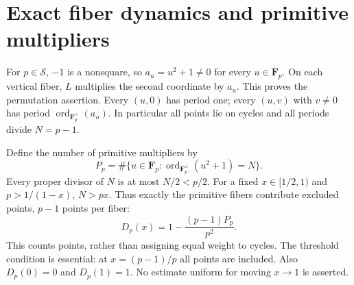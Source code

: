 \documentclass[11pt]{article}
\theoremstyle{remark}
\newcommand{\Fp}{\mathbf F_p}
\newcommand{\ord}{\operatorname{ord}}
\begin{document}
\section{Exact fiber dynamics and primitive multipliers}
For $p\in\mathcal S$, $-1$ is a nonsquare, so $a_u=u^2+1\ne0$ for
every $u\in\Fp$. On each vertical fiber, $L$ multiplies the second
coordinate by $a_u$. This proves the permutation assertion. Every
$(u,0)$ has period one; every $(u,v)$ with $v\ne0$ has period
$\ord_{\Fp^\times}(a_u)$. In particular all points lie on cycles and all
periods divide $N=p-1$.

Define the number of primitive multipliers by
\[
 P_p=\#\{u\in\Fp:\ord_{\Fp^\times}(u^2+1)=N\}.
\]
Every proper divisor of $N$ is at most $N/2<p/2$. For a fixed
$x\in[1/2,1)$ and $p>1/(1-x)$, $N>px$. Thus exactly the primitive
fibers contribute excluded points, $p-1$ points per fiber:
\begin{equation}\label{eq:exact}
 D_p(x)=1-\frac{(p-1)P_p}{p^2}.
\end{equation}
This counts points, rather than assigning equal weight to cycles.
The threshold condition is essential: at $x=(p-1)/p$ all points are
included. Also $D_p(0)=0$ and $D_p(1)=1$. No estimate uniform for moving
$x\to1$ is asserted.
\end{document}

